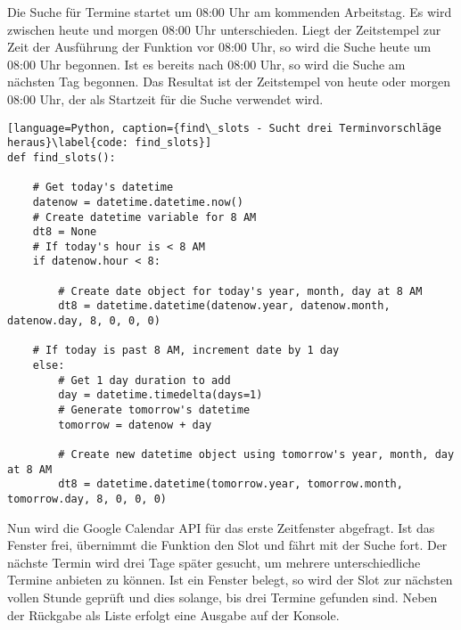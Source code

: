                 Die Suche für Termine startet um 08:00 Uhr am kommenden Arbeitstag. Es wird zwischen heute und morgen 08:00 Uhr unterschieden. Liegt der Zeitstempel zur Zeit der Ausführung der Funktion vor 08:00 Uhr, so wird die Suche heute um 08:00 Uhr begonnen. Ist es bereits nach 08:00 Uhr, so wird die Suche am nächsten Tag begonnen. Das Resultat ist der Zeitstempel von heute oder morgen 08:00 Uhr, der als Startzeit für die Suche verwendet wird.

            \begin{lstlisting}[language=Python, caption={find\_slots - Sucht drei Terminvorschläge heraus}\label{code: find_slots}]
def find_slots():

    # Get today's datetime
    datenow = datetime.datetime.now()
    # Create datetime variable for 8 AM
    dt8 = None
    # If today's hour is < 8 AM
    if datenow.hour < 8:

        # Create date object for today's year, month, day at 8 AM
        dt8 = datetime.datetime(datenow.year, datenow.month, datenow.day, 8, 0, 0, 0)

    # If today is past 8 AM, increment date by 1 day
    else:
        # Get 1 day duration to add
        day = datetime.timedelta(days=1)
        # Generate tomorrow's datetime
        tomorrow = datenow + day

        # Create new datetime object using tomorrow's year, month, day at 8 AM
        dt8 = datetime.datetime(tomorrow.year, tomorrow.month, tomorrow.day, 8, 0, 0, 0)
            \end{lstlisting}

            Nun wird die Google Calendar API für das erste Zeitfenster abgefragt. Ist das Fenster frei, übernimmt die Funktion den Slot und fährt mit der Suche fort. Der nächste Termin wird drei Tage später gesucht, um mehrere unterschiedliche Termine anbieten zu können. Ist ein Fenster belegt, so wird der Slot zur nächsten vollen Stunde geprüft und dies solange, bis drei Termine gefunden sind. Neben der Rückgabe als Liste erfolgt eine Ausgabe auf der Konsole.

